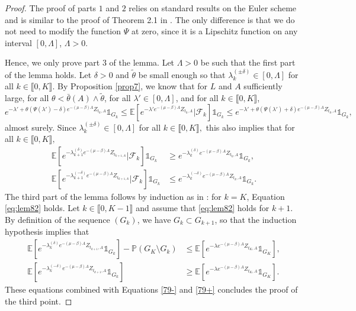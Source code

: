 \documentclass[11pt]{article}
\theoremstyle{plain}
\begin{document}
\begin{proof} The proof of parts $1$ and $2$ relies on standard results on the Euler scheme and is similar to the proof of Theorem 2.1 in \cite{Maillard:2020aa}. The only difference is that we do not need to modify the function $\Psi$ at zero, since it is a Lipschitz function on any interval $[0,\Lambda]$, $\Lambda>0.$

Hence, we only prove part $3$ of the lemma. 
Let $\Lambda>0$ be such that the first part of the lemma holds. Let $\delta>0$ and $\tilde \theta$ be small enough so that $\lambda_k^{(\pm\delta)}\in[0,\Lambda]$ for all $k\in \llbracket0,K\rrbracket.$ By Proposition \ref{prop7}, we know that for $L$ and $A$ sufficiently large, for all $\theta<\bar \theta(A)\wedge \tilde \theta$, for all $\lambda'\in[0,\Lambda]$, and for all $k\in \llbracket 0,K\rrbracket$, 
\begin{equation*}
e^{-\lambda'+\theta(\Psi(\lambda')-\delta)e^{-(\mu-\beta)A}Z_{t_k,A}}\mathbb{1}_{G_k}\leqslant \mathbb{E}\left[e^{-\lambda 'e^{-(\mu-\beta)A}Z_{t_k,A}}|\mathcal{F}_k\right]\mathbb{1}_{G_k}\leqslant e^{-\lambda'+\theta(\Psi(\lambda')+\delta)e^{-(\mu-\beta)A}Z_{t_k,A}}\mathbb{1}_{G_k},
\end{equation*}
almost surely.
Since $\lambda_k^{(\pm\delta)}\in[0,\Lambda]$ for all $k\in \llbracket0,K\rrbracket,$ this also implies that for all  $k\in \llbracket0,K\rrbracket,$
\begin{align}
\mathbb{E}\left[e^{-\lambda^{(\delta)}_{k+1}e^{-(\mu-\beta)A}Z_{t_{k+1,A}}}|\mathcal{F}_k\right]\mathbb{1}_{G_k}&\geqslant e^{-\lambda_k^{(\delta)}e^{-(\mu-\beta)A}Z_{t_k,A}}\mathbb{1}_{G_k},\label{79-} \\
\mathbb{E}\left[e^{-\lambda^{(-\delta)}_{k+1}e^{-(\mu-\beta)A}Z_{t_{k+1,A}}}|\mathcal{F}_k\right]\mathbb{1}_{G_k}&\leqslant e^{-\lambda_k^{(-\delta)}e^{-(\mu-\beta)A}Z_{t_k,A}}\mathbb{1}_{G_k}. \label{79+}
\end{align} 
The third part of the lemma follows by induction as in \cite{Maillard:2020aa}: for $k=K$, Equation \eqref{eq:lem82} holds. Let $k\in\llbracket 0,K-1\rrbracket$ and assume that \eqref{eq:lem82} holds for $k+1$. By definition of the sequence $(G_k)$, we have  $G_k\subset G_{k+1}$,  so that the induction hypothesis implies that 
\begin{align*}
\mathbb{E}\left[e^{-\lambda_k^{(\delta)}e^{-(\mu-\beta)A}Z_{t_{k+1},A}}\mathbb{1}_{G_k}\right]-\mathbb{P}\left(G_K\setminus G_k\right)&\leqslant\mathbb{E}\left[e^{-\lambda e^{-(\mu-\beta)A}Z_{t_K,A}}\mathbb{1}_{G_K}\right],\\
 \mathbb{E}\left[e^{-\lambda_k^{(-\delta)}e^{-(\mu-\beta)A}Z_{t_{k+1},A}}\mathbb{1}_{G_k}\right] & \geqslant\mathbb{E}\left[e^{-\lambda e^{-(\mu-\beta)A}Z_{t_K,A}}\mathbb{1}_{G_K}\right].
\end{align*}
These equations combined with Equations \eqref{79-} and \eqref{79+} concludes the proof of the third point.
\end{proof}
\end{document}
